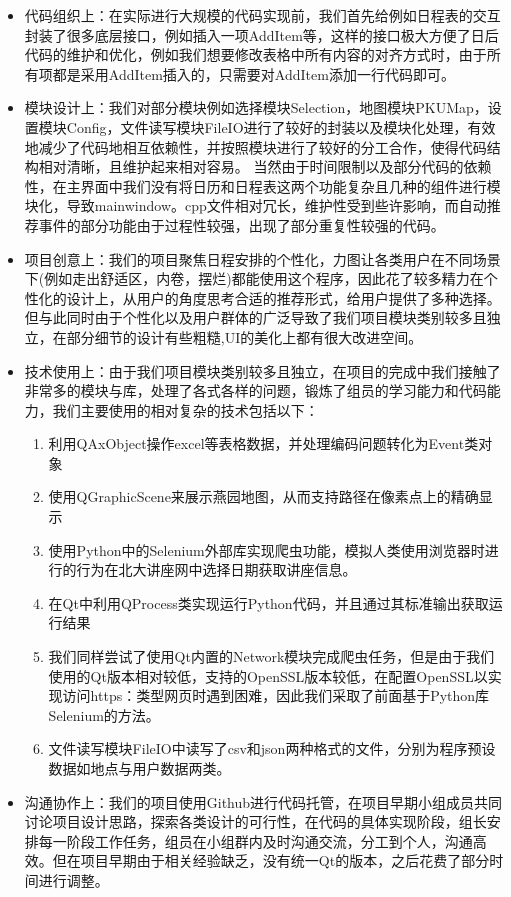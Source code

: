 \documentclass[11pt,hyperref,a4paper,UTF8]{ctexart}
\begin{document}
\begin{CJK}{UTF8}{gkai}
\begin{itemize}
    \item 代码组织上：在实际进行大规模的代码实现前，我们首先给例如日程表的交互封装了很多底层接口，例如插入一项AddItem等，这样的接口极大方便了日后代码的维护和优化，例如我们想要修改表格中所有内容的对齐方式时，由于所有项都是采用AddItem插入的，只需要对AddItem添加一行代码即可。
    \item 模块设计上：我们对部分模块例如选择模块Selection，地图模块PKUMap，设置模块Config，文件读写模块FileIO进行了较好的封装以及模块化处理，有效地减少了代码地相互依赖性，并按照模块进行了较好的分工合作，使得代码结构相对清晰，且维护起来相对容易。
    当然由于时间限制以及部分代码的依赖性，在主界面中我们没有将日历和日程表这两个功能复杂且几种的组件进行模块化，导致mainwindow。cpp文件相对冗长，维护性受到些许影响，而自动推荐事件的部分功能由于过程性较强，出现了部分重复性较强的代码。
    
    \item 项目创意上：我们的项目聚焦日程安排的个性化，力图让各类用户在不同场景下(例如走出舒适区，内卷，摆烂)都能使用这个程序，因此花了较多精力在个性化的设计上，从用户的角度思考合适的推荐形式，给用户提供了多种选择。但与此同时由于个性化以及用户群体的广泛导致了我们项目模块类别较多且独立，在部分细节的设计有些粗糙,UI的美化上都有很大改进空间。
    
    \item 技术使用上：由于我们项目模块类别较多且独立，在项目的完成中我们接触了非常多的模块与库，处理了各式各样的问题，锻炼了组员的学习能力和代码能力，我们主要使用的相对复杂的技术包括以下：
    \begin{enumerate}
        \item 利用QAxObject操作excel等表格数据，并处理编码问题转化为Event类对象
        \item 使用QGraphicScene来展示燕园地图，从而支持路径在像素点上的精确显示
        \item 使用Python中的Selenium外部库实现爬虫功能，模拟人类使用浏览器时进行的行为在北大讲座网中选择日期获取讲座信息。
        \item 在Qt中利用QProcess类实现运行Python代码，并且通过其标准输出获取运行结果
        \item 我们同样尝试了使用Qt内置的Network模块完成爬虫任务，但是由于我们使用的Qt版本相对较低，支持的OpenSSL版本较低，在配置OpenSSL以实现访问https：类型网页时遇到困难，因此我们采取了前面基于Python库Selenium的方法。
        \item 文件读写模块FileIO中读写了csv和json两种格式的文件，分别为程序预设数据如地点与用户数据两类。
    \end{enumerate}
    \item 沟通协作上：我们的项目使用Github进行代码托管，在项目早期小组成员共同讨论项目设计思路，探索各类设计的可行性，在代码的具体实现阶段，组长安排每一阶段工作任务，组员在小组群内及时沟通交流，分工到个人，沟通高效。但在项目早期由于相关经验缺乏，没有统一Qt的版本，之后花费了部分时间进行调整。
\end{itemize}


\end{CJK}
\end{document}
